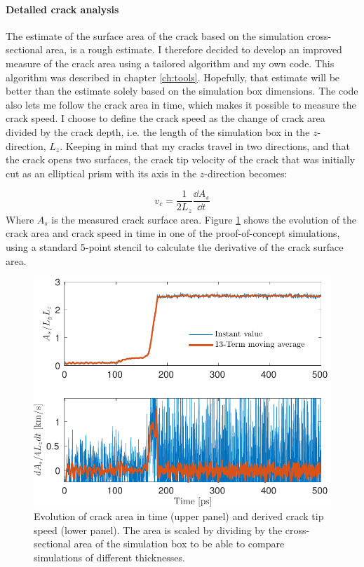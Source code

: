 \paragraph{Detailed crack analysis}
The estimate of the surface area of the crack based on the simulation cross-sectional area, is a rough estimate. I therefore decided to develop an improved measure of the crack area using a tailored algorithm and my own code. This algorithm was described in chapter \ref{ch:tools}. Hopefully, that estimate will be better than the estimate solely based on the simulation box dimensions. The code also lets me follow the crack area in time, which makes it possible to measure the crack speed. I choose to define the crack speed as the change of crack area divided by the crack depth, i.e. the length of the simulation box in the $z$-direction, $L_z$. Keeping in mind that my cracks travel in two directions, and that the crack opens two surfaces, the crack tip velocity of the crack that was initially cut as an elliptical prism with its axis in the $z$-direction becomes:

\begin{equation}
v_c = \frac{1}{2L_z}\frac{\dd A_s}{\dd t}
\end{equation}
%
Where $A_s$ is the measured crack surface area. Figure \ref{fig:crack_in_time_thin} shows the evolution of the crack area and crack speed in time in one of the proof-of-concept simulations, using a standard 5-point stencil to calculate the derivative of the crack surface area.
\begin{figure}
\centering
\includegraphics[width=12cm]{../figures/thesis/crack_in_time_thin.pdf}
\caption{Evolution of crack area in time (upper panel) and derived crack tip speed (lower panel). The area is scaled by dividing by the cross-sectional area of the simulation box to be able to compare simulations of different thicknesses.}
\label{fig:crack_in_time_thin}
\end{figure}

